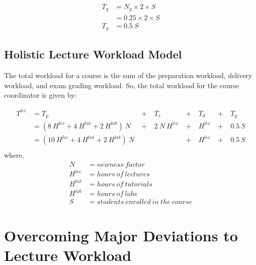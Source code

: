 \begin{equation}
  \label{eqn:exam-grading-workload}
  \begin{aligned}
    T_g & = N_g \times 2 \times S  \\
        & = 0.25 \times 2 \times S \\
    T_g & = 0.5\ S
  \end{aligned}
\end{equation}

\subsection{Holistic Lecture Workload Model}

The total workload for a course is the sum of the preparation workload, delivery workload, and exam grading workload. So, the total workload for the course coordinator is given by:

\begin{equation}
  \begin{aligned}
    T^{lec} & = T_p                                        & \ +\  & T_r            & \ +\  & T_d     & \ +\  & T_g    \\
            & = (8\ H^{lec} + 4\ H^{tut} + 2\ H^{lab})\ N  & \ +\  & 2\ N\  H^{lec} & \ +\  & H^{lec} & \ +\  & 0.5\ S \\
            & = (10\ H^{lec} + 4\ H^{tut} + 2\ H^{lab})\ N &       &                & \ +\  & H^{lec} & \ +\  & 0.5\ S \\
  \end{aligned}
\end{equation}
where,
\begin{equation*}
  \begin{aligned}
    N       & = newness\ factor                     \\
    H^{lec} & = hours\ of\ lectures                 \\
    H^{tut} & = hours\ of\ tutorials                \\
    H^{lab} & = hours\ of\ labs                     \\
    S       & = students\ enrolled\ in\ the\ course
  \end{aligned}
\end{equation*}

\section{Overcoming Major Deviations to Lecture Workload}

